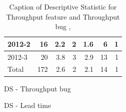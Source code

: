 \documentclass[UKenglish]{ifimaster}  %
\begin{document}
\begin{appendices}
\begin{table}[!htbp]
\begin{adjustwidth}{-1.5cm}{}
\begin{subfigure}[b]{0.3\textwidth}
{\begin{tabular}{ | l | r | r | r | r | r | r | }
 2012-2  & 16 & 2.2 & 2 & 1.6 & 6 & 1 \\ \hline
 2012-3  & 20 & 3.8 & 3 & 2.9 & 13 & 1 \\ \hline
 Total  & 172 & 2.6 & 2 & 2.1 & 14 & 1 \\ \hline
\end{tabular}
}
\caption{DS - Throughput bug}
 \label{DS:TPB:7}
\end{subfigure}
\end{adjustwidth}
\caption[Optional caption for list of figures]{Caption of Descriptive Statistic for Throughput feature and Throughput bug  , }
\label{DS:7:2}
\end{table}



\begin{table}[!htbp]
  \begin{adjustwidth}{-1.5cm}{}
\begin{subfigure}[b]{0.7\textwidth}
\caption{DS - Lead time}
 \label{DS:LT:7}
\end{subfigure}
\begin{subfigure}[b]{0.3\textwidth}
\end{subfigure}
\end{adjustwidth}
\end{table}
\end{appendices}
\end{document}

